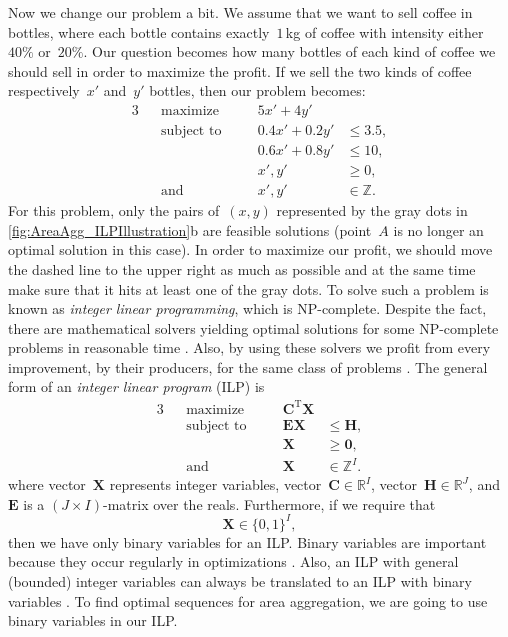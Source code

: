 \documentclass[acmsmall,natbib=false]{acmart}
\begin{document}
Now we change our problem a bit.
We assume that we want to sell coffee in bottles,
where each bottle contains exactly~$1\,$kg of coffee 
with intensity either~$40\%$ or~$20\%$.
Our question becomes how many bottles of each kind of coffee
we should sell in order to maximize the profit.
If we sell the two kinds of coffee 
respectively~$x'$ and~$y'$ bottles,
then our problem becomes:
\begin{alignat*}{3}
&&\text{maximize} 	\quad	&& 5x'+4y' 		&			\\
&&\text{subject to} \quad	&& 0.4x'+0.2y'	&\le 3.5, 	\\
&&					\quad	&& 0.6x'+0.8y' 	&\le 10, 	\\
&&					\quad	&& x', y' 		&\ge 0, 	\\
&&\text{and} 		\quad	&& x', y'		&\in \mathbb{Z}.
\end{alignat*}
For this problem, only the pairs of~$(x,y)$ 
represented by the gray dots in \fig\ref{fig:AreaAgg_ILPIllustration}b 
are feasible solutions
(point~$A$ is no longer an optimal solution in this case).
In order to maximize our profit,
we should move the dashed line to the upper right 
as much as possible
and at the same time make sure that 
it hits at least one of the gray dots.
To solve such a problem is known as
\emph{integer linear programming},
which is NP-complete.
Despite the fact, there are
mathematical solvers yielding optimal solutions
for some NP-complete problems in reasonable time
\parencite{Haunert2017Label}.
Also, by using these solvers we profit 
from every improvement, by their producers,
for the same class of problems
\parencite{Haunert2017Label}.
The general form of an \emph{integer linear program} (ILP) is
\begin{alignat*}{3}
&&\text{maximize} 	\quad&& \bm{C}^\mathrm{T}\bm{X}	&		\\
&&\text{subject to} \quad&& \bm{EX}			&\le \bm{H}, 	\\
&&					\quad&& \bm{X} 			&\ge \bm{0}, 	\\
&&\text{and}		\quad&& \bm{X} 			&\in \mathbb{Z}^I.
\end{alignat*}
where vector~$\bm{X}$ represents integer variables, 
vector~$\bm{C} \in \mathbb{R}^I$, 
vector~$\bm{H} \in \mathbb{R}^J$,
and~$\bm{E}$ is a $(J \times I)$-matrix over the reals.
Furthermore, if we require that
$$
\bm{X} 	\in \{0,1\}^I,
$$
then we have only binary variables for an ILP.
Binary variables are important 
because they occur regularly in optimizations
\parencite[]{bradley1977applied}.
Also, an ILP with general (bounded) integer variables 
can always be translated to an ILP with binary variables
\parencite[]{Williams2009Integer}.
To find optimal sequences for area aggregation, 
we are going to use binary variables in our ILP.
\end{document}
